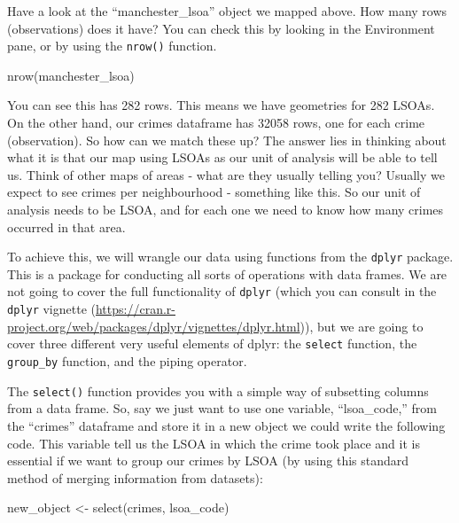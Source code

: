 \documentclass[
]{book}
\makeatletter
\newenvironment{Shaded}{\begin{snugshade}}{\end{snugshade}}
\newcommand{\FunctionTok}[1]{\textcolor[rgb]{0,0,0}{#1}}
\newcommand{\NormalTok}[1]{#1}
\newcommand{\OtherTok}[1]{\textcolor[rgb]{0.37,0.37,0.37}{#1}}
\newenvironment{kframe}{%
\medskip{}
\setlength{\fboxsep}{.8em}
 \def\at@end@of@kframe{}%
 \ifinner\ifhmode%
  \def\at@end@of@kframe{\end{minipage}}%
  \begin{minipage}{\columnwidth}%
 \fi\fi%
 \def\FrameCommand##1{\hskip\@totalleftmargin \hskip-\fboxsep
 \colorbox{shadecolor}{##1}\hskip-\fboxsep
     \hskip-\linewidth \hskip-\@totalleftmargin \hskip\columnwidth}%
 \MakeFramed {\advance\hsize-\width
   \@totalleftmargin\z@ \linewidth\hsize
   \@setminipage}}%
 {\par\unskip\endMakeFramed%
 \at@end@of@kframe}
\renewenvironment{Shaded}{\begin{kframe}}{\end{kframe}}
\makeatother
\begin{document}
Have a look at the ``manchester\_lsoa'' object we mapped above. How many rows (observations) does it have? You can check this by looking in the Environment pane, or by using the \texttt{nrow()} function.

\begin{Shaded}
\begin{Highlighting}[]
\FunctionTok{nrow}\NormalTok{(manchester\_lsoa)}
\end{Highlighting}
\end{Shaded}

You can see this has 282 rows. This means we have geometries for 282 LSOAs. On the other hand, our crimes dataframe has 32058 rows, one for each crime (observation). So how can we match these up? The answer lies in thinking about what it is that our map using LSOAs as our unit of analysis will be able to tell us. Think of other maps of areas - what are they usually telling you? Usually we expect to see crimes per neighbourhood - something like this. So our unit of analysis needs to be LSOA, and for each one we need to know how many crimes occurred in that area.

To achieve this, we will wrangle our data using functions from the \texttt{dplyr} package. This is a package for conducting all sorts of operations with data frames. We are not going to cover the full functionality of \texttt{dplyr} (which you can consult in the \texttt{dplyr} vignette (\url{https://cran.r-project.org/web/packages/dplyr/vignettes/dplyr.html})), but we are going to cover three different very useful elements of dplyr: the \texttt{select} function, the \texttt{group\_by} function, and the piping operator.

The \texttt{select()} function provides you with a simple way of subsetting columns from a data frame. So, say we just want to use one variable, ``lsoa\_code,'' from the ``crimes'' dataframe and store it in a new object we could write the following code. This variable tell us the LSOA in which the crime took place and it is essential if we want to group our crimes by LSOA (by using this standard method of merging information from datasets):

\begin{Shaded}
\begin{Highlighting}[]
\NormalTok{new\_object }\OtherTok{\textless{}{-}} \FunctionTok{select}\NormalTok{(crimes, lsoa\_code)}
\end{Highlighting}
\end{Shaded}
\end{document}
